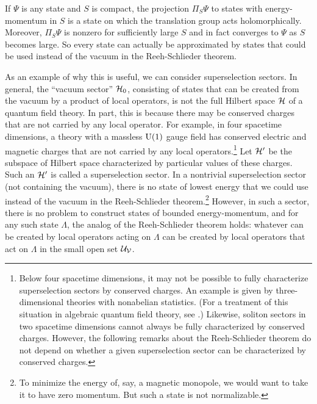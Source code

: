 \documentclass[12pt]{article}
\numberwithin{equation}{section}
\begin{document}
If $\Psi$ is any state and $S$ is compact, the projection $\Pi_S\Psi$ to states with energy-momentum in $S$ is a state on which
the translation group acts holomorphically.  Moreover,  $\Pi_S\Psi$ is nonzero for sufficiently large $S$ and in fact converges to $\Psi$
as $S$ becomes large.  So every state can actually be approximated by states that could be used instead of the vacuum in the
Reeh-Schlieder theorem.

As an example of why this is useful, we can consider superselection sectors.  In general, the ``vacuum sector'' ${\mathcal H}_0$, consisting
of states that can be created from the vacuum by a product of local operators, is not the full Hilbert space ${\mathcal H}$ of a quantum field theory.
In part, this is because there may be conserved charges that are not carried by any local operator.  For example, in four spacetime dimensions, a theory with a massless ${\mathrm U}(1)$ gauge field has conserved
electric and magnetic charges that are not carried by any local operators.\footnote{Below four spacetime dimensions,
it may not be possible to fully characterize superselection sectors by conserved charges.  An example is given by
three-dimensional theories with nonabelian statistics.  (For a treatment of this situation in algebraic quantum
field theory, see \cite{FRS}.) 
  Likewise, soliton sectors in two spacetime dimensions cannot always be
fully characterized by conserved charges.
However, the following remarks about the Reeh-Schlieder theorem do not depend on whether a given superselection sector
can be characterized by conserved charges.}  
  Let ${\mathcal H}'$ be the subspace of Hilbert space characterized by 
particular values of these charges.  Such an ${\mathcal H}'$ is called a superselection sector.  In a nontrivial superselection sector (not containing
the vacuum), there is no state of lowest energy that we could use instead of the vacuum in the Reeh-Schlieder theorem.\footnote{To minimize
the energy of, say, a magnetic monopole, we would want to take it to have zero momentum.  But such a state is not normalizable.}
However, in such a sector, there is no problem to construct states of bounded energy-momentum, and for any such state $\Lambda$,
the analog of the Reeh-Schlieder theorem holds:  whatever can be created by local operators acting on $\Lambda$ can be created
by local operators that act on $\Lambda$ in the small open set ${\mathcal U}_{\mathcal V}$.
\end{document}
